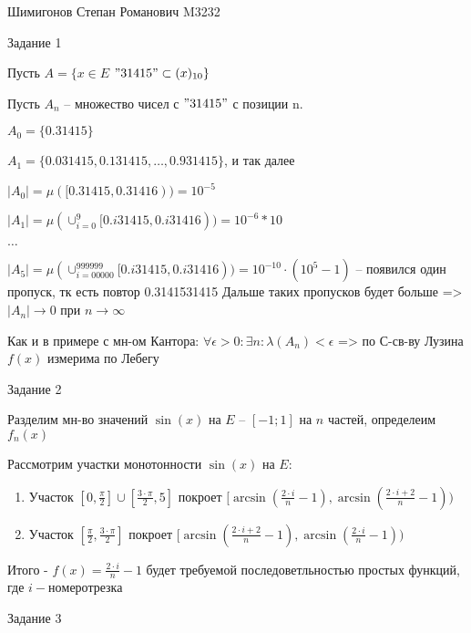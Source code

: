 \documentclass[a4paper,10pt]{article}
\begin{document}
    Шимигонов Степан Романович M3232
    \newline

    Задание 1
    \newline

    Пусть $A = \{x \in E$ \textbar $"31415" \subset (x)_{10}\}$
    

    Пусть $A_n$ -- множество чисел с $"31415"$ с позиции n.
    
    
    $A_0 = \{0.31415\}$


    $A_1 = \{0.031415, 0.131415, \ldots, 0.931415\}$, и так далее

    $\left| A_0\right| = \mu ([0.31415, 0.31416)) = 10^{-5}$


    $\left| A_1\right| = \mu (\cup_{i=0}^{9}[0.i31415, 0.i31416)) = 10^{-6} * 10$


    $\ldots$

    $\left| A_5\right| = \mu (\cup_{i=00000}^{999999}[0.i31415, 0.i31416)) = 10^{-10} \cdot (10^5 - 1)$ -- появился один пропуск, тк есть повтор 0.3141531415
    Дальше таких пропусков будет больше => $\left| A_n\right| \to 0$ при $n \to \infty$

    Как и в примере с мн-ом Кантора: $\forall \epsilon > 0: \exists n: \lambda(A_n) < \epsilon$ => по С-св-ву Лузина $f(x)$ измерима по Лебегу
    \newline

    Задание 2


    Разделим мн-во значений $\sin(x)$ на $E$ -- $[-1; 1]$ на $n$ частей, определеим $f_n(x)$


    Рассмотрим участки монотонности $\sin(x)$ на $E$:

    \begin{enumerate}
        \item Участок $[0, \frac{ \pi}{ 2} ] \cup [\frac{3 \cdot \pi  }{2}, 5 ]$ покроет $[\arcsin(\frac{2 \cdot i}{n} - 1), \arcsin(\frac{2 \cdot i + 2}{n} - 1))$
        \item Участок $[\frac{ \pi}{ 2}, \frac{3 \cdot \pi  }{2}]$ покроет $[\arcsin(\frac{2 \cdot i + 2}{n} - 1), \arcsin(\frac{2 \cdot i}{n} - 1))$
    \end{enumerate}

    Итого - $f(x) = \frac{2 \cdot i}{n} - 1$ будет требуемой последоветльностью простых функций, где $i - номер отрезка$
    \newline

    Задание 3
    \newline
    
\end{document}

